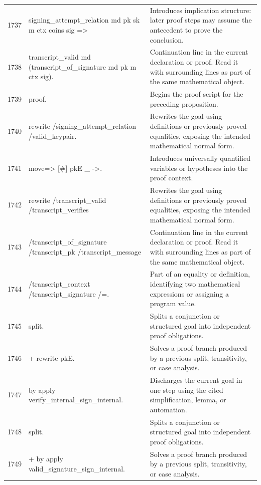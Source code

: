 \documentclass[10pt]{article}
\begin{document}
\begin{longtable}{r L{0.53\textwidth} L{0.37\textwidth}}
1737 & {\ttfamily\scriptsize   signing\_attempt\_relation md pk sk m ctx coins sig =>} & Introduces implication structure: later proof steps may assume the antecedent to prove the conclusion. \\
1738 & {\ttfamily\scriptsize   transcript\_valid md (transcript\_of\_signature md pk m ctx sig).} & Continuation line in the current declaration or proof.  Read it with surrounding lines as part of the same mathematical object. \\
1739 & {\ttfamily\scriptsize proof.} & Begins the proof script for the preceding proposition. \\
1740 & {\ttfamily\scriptsize rewrite /signing\_attempt\_relation /valid\_keypair.} & Rewrites the goal using definitions or previously proved equalities, exposing the intended mathematical normal form. \\
1741 & {\ttfamily\scriptsize move=> [\#] pkE \_ ->.} & Introduces universally quantified variables or hypotheses into the proof context. \\
1742 & {\ttfamily\scriptsize rewrite /transcript\_valid /transcript\_verifies} & Rewrites the goal using definitions or previously proved equalities, exposing the intended mathematical normal form. \\
1743 & {\ttfamily\scriptsize         /transcript\_of\_signature /transcript\_pk /transcript\_message} & Continuation line in the current declaration or proof.  Read it with surrounding lines as part of the same mathematical object. \\
1744 & {\ttfamily\scriptsize         /transcript\_context /transcript\_signature /=.} & Part of an equality or definition, identifying two mathematical expressions or assigning a program value. \\
1745 & {\ttfamily\scriptsize split.} & Splits a conjunction or structured goal into independent proof obligations. \\
1746 & {\ttfamily\scriptsize + rewrite pkE.} & Solves a proof branch produced by a previous split, transitivity, or case analysis. \\
1747 & {\ttfamily\scriptsize   by apply verify\_internal\_sign\_internal.} & Discharges the current goal in one step using the cited simplification, lemma, or automation. \\
1748 & {\ttfamily\scriptsize split.} & Splits a conjunction or structured goal into independent proof obligations. \\
1749 & {\ttfamily\scriptsize + by apply valid\_signature\_sign\_internal.} & Solves a proof branch produced by a previous split, transitivity, or case analysis. \\

\end{longtable}
\end{document}
